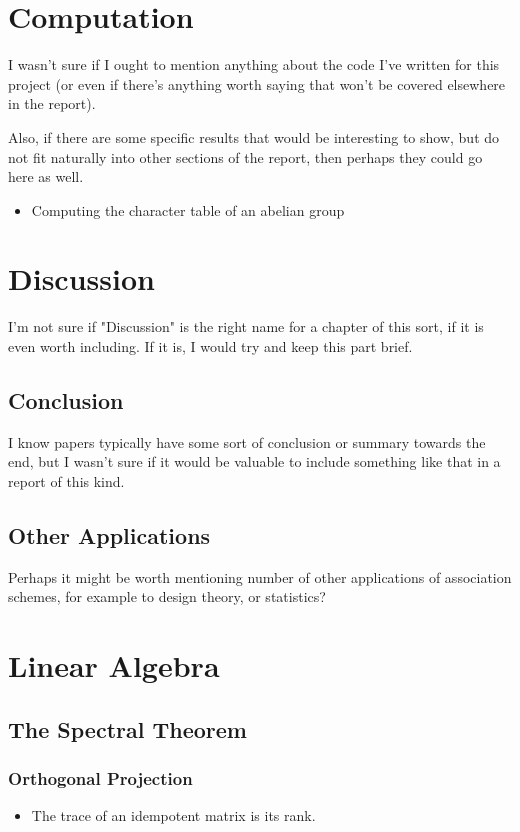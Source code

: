 \documentclass{report}
\begin{document}
\chapter{Computation}
  I wasn't sure if I ought to mention anything about the code I've written for
  this project (or even if there's anything worth saying that won't be covered
  elsewhere in the report).

  Also, if there are some specific results that would be interesting to show,
  but do not fit naturally into other sections of the report, then perhaps they
  could go here as well.

  \begin{itemize}
    \item Computing the character table of an abelian group
  \end{itemize}

\chapter{Discussion}
  I'm not sure if "Discussion" is the right name for a chapter of this sort, if
  it is even worth including.  If it is, I would try and keep this part brief.

  \section{Conclusion}
    I know papers typically have some sort of conclusion or summary towards the
    end, but I wasn't sure if it would be valuable to include something like
    that in a report of this kind.

  \section{Other Applications}
    Perhaps it might be worth mentioning number of other applications of
    association schemes, for example to design theory, or statistics?

\appendix

\chapter{Linear Algebra}
  \section{The Spectral Theorem}
    \subsection{Orthogonal Projection}
      \begin{itemize}
        \item The trace of an idempotent matrix is its rank.
      \end{itemize}
\end{document}
